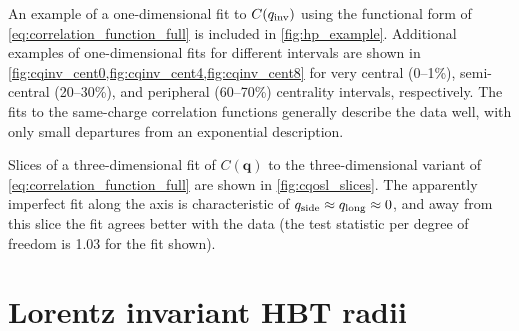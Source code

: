 An example of a one-dimensional fit to $C(q_{\mathrm{inv}})$ using the functional form of \cref{eq:correlation_function_full} is included in \cref{fig:hp_example}.
Additional examples of one-dimensional fits for different \kt intervals are shown in \cref{fig:cqinv_cent0,fig:cqinv_cent4,fig:cqinv_cent8} for very central (0--1\%), semi-central (20--30\%), and peripheral (60--70\%) centrality intervals, respectively.
The fits to the same-charge correlation functions generally describe the data well, with only small departures from an exponential description.



Slices of a three-dimensional fit of $C(\mathbf{q})$ to the three-dimensional variant of \cref{eq:correlation_function_full} are shown in \cref{fig:cqosl_slices}.
The apparently imperfect fit along the \qout axis is characteristic of $q_{\mathrm{side}} \approx q_{\mathrm{long}} \approx 0$, and away from this slice the  fit agrees better with the data (the test statistic per degree of freedom is 1.03 for the fit shown). 


\FloatBarrier
\section{Lorentz invariant HBT radii}
\label{sec:invariant_results}

